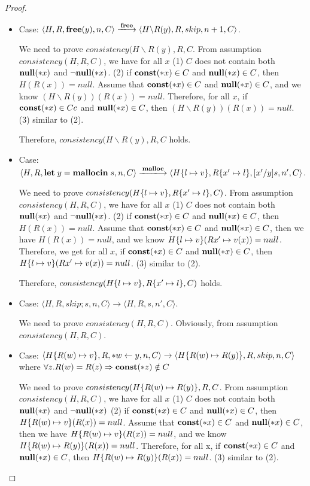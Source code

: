 \begin{proof}
\begin{itemize}
  \item Case: \(\langle H, R, \Free(y), n, C \rangle \xlongrightarrow{\Free}
    \langle H\backslash R(y), R, skip, n+1, C  \rangle \).

    We need to prove \(consistency(H\backslash R(y), R, C\). From
    assumption \(consistency(H, R, C)\), we have for all \(x\) (1)
    \(C\) does not contain both \({\bf null}(*x)\) and \(\neg{\bf null}(*x)\). (2) if
    \(\mathbf{const}(*x) \in C\) and \({\bf null}(*x) \in C\), then \(H(R(x)) =
    null\). Assume that \(\mathbf{const}(*x) \in C\) and \({\bf null}(*x) \in C\), and
    we know \((H\backslash R(y))(R(x)) = null\). Therefore, for all
    \(x\), if \(\mathbf{const}(*x) \in Cc\) and \({\bf null}(*x) \in C\), then
    \((H\backslash R(y))(R(x)) = null\). (3) similar to (2).

    Therefore, \(consistency(H\backslash R(y), R, C\) holds.
    
    
\item Case: \(\langle H, R, \LET y = \Malloc \IN s, n, C \rangle
  \xlongrightarrow{\Malloc} \langle H\set{l \mapsto v}, R\set{x'
    \mapsto l}, [x'/y]s, n', C \rangle \).

    We need to prove \(consistency(H\{l \mapsto v\}, R\{x'
      \mapsto l\}, C )\). From assumption \(consistency(H, R, C)\), we
    have for all \(x\) (1) \(C\) does not contain both \({\bf null}(*x)\) and
    \(\neg{\bf null}(*x)\). (2) if \(\mathbf{const}(*x) \in C\) and \({\bf null}(*x) \in C\),
    then \(H(R(x)) = null\). Assume that \(\mathbf{const}(*x) \in C\) and
    \({\bf null}(*x) \in C\), then we have \(H(R(x)) = null\), and we know
    \(H\{l \mapsto v\}(R{x' \mapsto v}(x)) = null \). Therefore, we
    get for all \(x\), if \(\mathbf{const}(*x) \in C \) and
    \({\bf null}(*x) \in C \), then \(H\{l \mapsto v\}(R{x'
      \mapsto v}(x)) = null \). (3) similar to (2).
                 
    Therefore, \(consistency(H\{l \mapsto v\}, R\{x' \mapsto l\},
    C )\) holds.

\item Case: \(\langle H, R, skip;s, n, C \rangle \rightarrow
    \langle H, R, s, n', C \rangle \).

    We need to prove \(consistency(H, R, C) \). Obviously, from
    assumption \(consistency(H, R, C) \).

\item Case: \(\langle H\{R(w) \mapsto v\}, R, *w \leftarrow y, n, C
  \rangle \rightarrow \langle H\{R(w) \mapsto R(y)\}, R, skip, n, C
  \rangle \) where \( \forall z. R(w) = R(z) \Rightarrow \mathbf{const}(*z)
  \notin C \)

    We need to prove \(consistency(H\{R(w) \mapsto R(y)\}, R, C \). From assumption \(consistency(H, R, C)\), we have
    for all \(x\) (1) \(C\) does not contain both \({\bf null}(*x)\) and
    \(\neg{\bf null}(*x)\) (2) if \(\mathbf{const}(*x) \in C\) and \({\bf null}(*x) \in C\), then
    \(H\{R(w) \mapsto v\}(R(x)) = null\). Assume that \(\mathbf{const}(*x)
    \in C\) and \({\bf null}(*x) \in C\), then we have \(H\{R(w) \mapsto
      v\}(R(x)) = null\), and we know \(H\{R(w) \mapsto R(y)\}(R(x))
    = null\). Therefore, for all x, if \(\mathbf{const}(*x) \in C \) and
    \({\bf null}(*x) \in C \), then \(H\{R(w) \mapsto R(y)\}(R(x)) =
    null\). (3) similar to (2).
                 

\end{itemize}
\end{proof}
